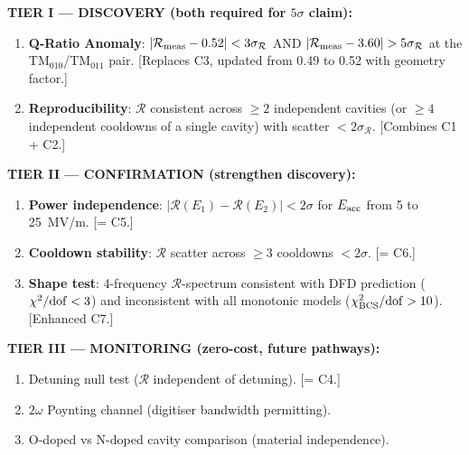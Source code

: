 \documentclass[11pt]{article}
\theoremstyle{definition}
\theoremstyle{remark}
\begin{document}
\begin{tcolorbox}[colback=green!5!white, colframe=green!60!black,
  title=\textbf{DETECTION CRITERIA: 3-TIER HIERARCHY (revised from C1--C7)}]

\textbf{TIER I --- DISCOVERY (both required for $5\sigma$ claim):}
\begin{enumerate}[label=\textbf{D\arabic*.}]
\item \textbf{Q-Ratio Anomaly}: $|\mathcal{R}_{\rm meas} - 0.52|
  < 3\sigma_{\mathcal{R}}$ AND $|\mathcal{R}_{\rm meas} - 3.60|
  > 5\sigma_{\mathcal{R}}$ at the TM$_{010}$/TM$_{011}$ pair.
  [Replaces C3, updated from 0.49 to 0.52 with geometry factor.]
\item \textbf{Reproducibility}: $\mathcal{R}$ consistent across
  $\geq 2$ independent cavities (or $\geq 4$ independent cooldowns
  of a single cavity) with scatter $< 2\sigma_{\mathcal{R}}$.
  [Combines C1 + C2.]
\end{enumerate}

\textbf{TIER II --- CONFIRMATION (strengthen discovery):}
\begin{enumerate}[label=\textbf{S\arabic*.}]
\item \textbf{Power independence}: $|\mathcal{R}(E_1) - \mathcal{R}(E_2)|
  < 2\sigma$ for $E_{\rm acc}$ from 5 to 25~MV/m. [= C5.]
\item \textbf{Cooldown stability}: $\mathcal{R}$ scatter across $\geq 3$
  cooldowns $< 2\sigma$. [= C6.]
\item \textbf{Shape test}: 4-frequency $\mathcal{R}$-spectrum consistent
  with DFD prediction ($\chi^2/{\rm dof} < 3$) and inconsistent with
  all monotonic models ($\chi^2_{\rm BCS}/{\rm dof} > 10$). [Enhanced C7.]
\end{enumerate}

\textbf{TIER III --- MONITORING (zero-cost, future pathways):}
\begin{enumerate}[label=\textbf{M\arabic*.}]
\item Detuning null test ($\mathcal{R}$ independent of detuning). [= C4.]
\item $2\omega$ Poynting channel (digitiser bandwidth permitting).
\item O-doped vs N-doped cavity comparison (material independence).
\end{enumerate}

\end{tcolorbox}


\end{document}
